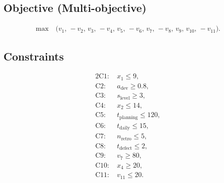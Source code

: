 \documentclass{article}
\begin{document}
\subsection*{Objective (Multi-objective)}
\begin{align*}
\max\ & \bigl(v_1,\,-v_2,\,v_3,\,-v_4,\,v_5,\,-v_6,\,v_7,\,-v_8,\,v_9,\,v_{10},\,-v_{11}\bigr).
\end{align*}

\subsection*{Constraints}
\begin{alignat*}{2}
\text{C1: } & x_1 \le 9, \\
\text{C2: } & a_{\text{dev}} \ge 0.8, \\
\text{C3: } & s_{\text{level}} \ge 3, \\
\text{C4: } & x_2 \le 14, \\
\text{C5: } & t_{\text{planning}} \le 120, \\
\text{C6: } & t_{\text{daily}} \le 15, \\
\text{C7: } & n_{\text{retro}} \le 5, \\
\text{C8: } & t_{\text{defect}} \le 2, \\
\text{C9: } & v_7 \ge 80, \\
\text{C10: } & x_4 \ge 20, \\
\text{C11: } & v_{11} \le 20.
\end{alignat*}
\end{document}
